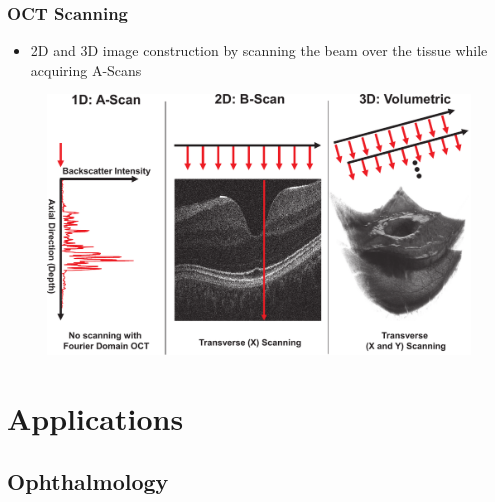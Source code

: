 \begin{frame}
{\begin{columns}[b, onlytextwidth]
\begin{column}{0.5\textwidth}
            \end{column}
        \end{columns}
    }

\end{frame}

\begin{frame}
    \frametitle{OCT Scanning}
    \begin{itemize}
        \item 2D and 3D image construction by scanning the beam over the tissue while acquiring A-Scans
    \end{itemize}
    \begin{figure}
        \includegraphics[height=0.65\textheight]{figures/OCTScanning.pdf}
    \end{figure}

\end{frame}


\section{Applications}

\subsection{Ophthalmology}%
\label{sub:ophthalmology}

